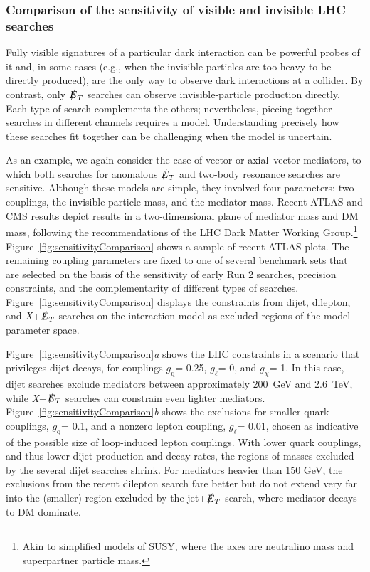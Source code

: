 \documentclass{ar-1col}
\newcommand{\chiDM}{\ensuremath{\chi}\xspace}
\newcommand{\IP}{invisible particle}
\newcommand{\gDM}{\ensuremath{g_{\chiDM}}\xspace}
\newcommand{\gdm}{\gDM}
\newcommand{\gl}{$g_{\ell}$\xspace}
\newcommand{\gq}{$g_{\mathrm{q}}$\xspace}
\newcommand{\MET}{\ensuremath{\slashed{E}_T}\xspace}
\begin{document}
{\subsubsection{Comparison of the sensitivity of visible and invisible LHC searches}\label{sub:comparisonVisibleInvisible}

Fully visible signatures of a particular dark interaction can be
powerful probes of it and, in some cases (e.g., when the {\IP}s
are too heavy to be directly produced), are the only way to observe
dark interactions at a collider. By contrast, only \MET
searches can observe invisible-particle production directly.
Each type of search complements the others; nevertheless, piecing
together searches in different channels requires a model.
Understanding precisely how these searches fit together can be
challenging when the model is uncertain.

As an example, we again consider the case of vector or
axial--vector mediators, to which both searches for anomalous \MET and two-body
resonance searches are sensitive. Although these models are simple,
they involved four parameters: two couplings, the invisible-particle
mass, and the mediator mass. Recent ATLAS and CMS results depict
results in a two-dimensional plane of mediator mass and DM
mass, following the recommendations of the LHC Dark Matter Working
Group.\footnote{Akin to simplified models of SUSY, where the axes
are neutralino mass and superpartner particle mass.}
Figure~\ref{fig:sensitivityComparison} shows a sample of
recent ATLAS plots. The remaining coupling parameters are
fixed to one of several benchmark sets that are selected on the basis of the
sensitivity of early Run 2 searches, precision constraints, and
the complementarity of different types of searches. Figure~\ref{fig:sensitivityComparison} displays the
constraints from dijet, dilepton, and \textit{X}+\MET searches on the
interaction model as excluded regions of the model
parameter space.

Figure~\ref{fig:sensitivityComparison}\textit{a} shows the LHC constraints
in a scenario that privileges dijet decays, for couplings
\gq = 0.25, \gl = 0, and \gdm = 1. 
In this case, dijet searches exclude
mediators between approximately 200~GeV and 2.6~TeV, while \textit{X}+\MET searches
can constrain even lighter mediators. 
Figure~\ref{fig:sensitivityComparison}\textit{b} shows the
exclusions for smaller quark couplings, \gq = 0.1, and a nonzero
lepton coupling, \gl = 0.01, chosen as indicative of the possible
size of loop-induced lepton couplings. With lower quark couplings,
and thus lower dijet production and decay rates, the regions of
masses excluded by the several dijet searches shrink. For
mediators heavier than 150 GeV, the exclusions from the recent
dilepton search fare better but do not extend very far into the
(smaller) region excluded by the jet+\MET search, where mediator
decays to DM dominate.

}
\end{document}
